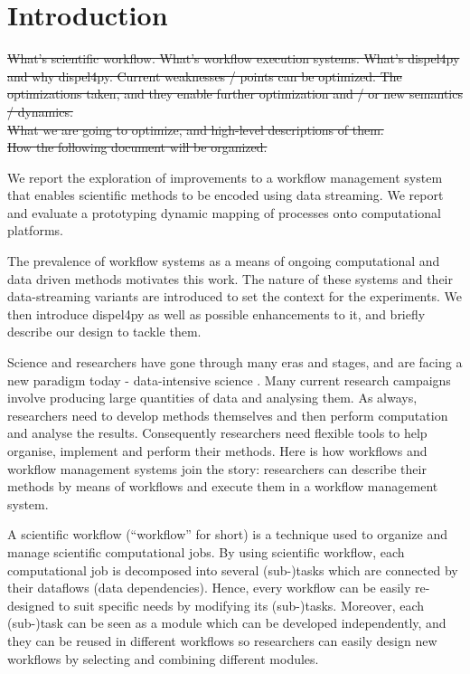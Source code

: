 \chapter{Introduction}
\sout{What's scientific workflow. What's workflow execution systems. What's dispel4py and why dispel4py. Current weaknesses / points can be optimized. The optimizations taken, and they enable further optimization and / or new semantics / dynamics. \\
What we are going to optimize, and high-level descriptions of them. \\
How the following document will be organized.}

We report the exploration of improvements to a workflow management system that enables scientific methods to be encoded using data streaming. We report and evaluate a prototyping dynamic mapping of processes onto computational platforms.

The prevalence of workflow systems as a means of ongoing computational and data driven methods motivates this work. The nature of these systems and their data-streaming variants are introduced to set the context for the experiments. We then introduce dispel4py as well as possible enhancements to it, and briefly describe our design to tackle them.

Science and researchers have gone through many eras and stages, and are facing a new paradigm today - data-intensive science \cite{hey2009fourth}. Many current research campaigns involve producing large quantities of data and analysing them. As always, researchers need to develop methods themselves and then perform computation and analyse the results. Consequently researchers need flexible tools to help organise, implement and perform their methods. Here is how workflows and workflow management systems join the story: researchers can describe their methods by means of workflows and execute them in a workflow management system.

A scientific workflow (``workflow'' for short) is a technique used to organize and manage scientific computational jobs. By using scientific workflow, each computational job is decomposed into several (sub-)tasks which are connected by their dataflows (data dependencies). Hence, every workflow can be easily re-designed to suit specific needs by modifying its (sub-)tasks. Moreover, each (sub-)task can be seen as a module which can be developed independently, and they can be reused in different workflows so researchers can easily design new workflows by selecting and combining different modules.

